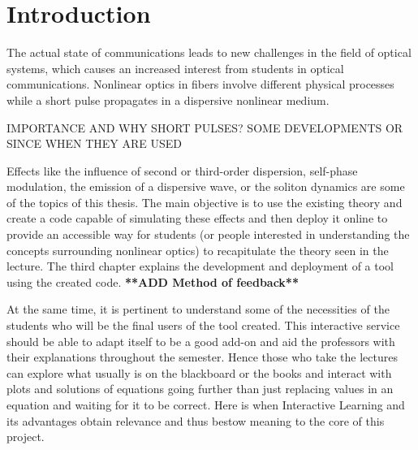 \chapter{Introduction}

The actual state of communications leads to new challenges in the field of optical systems, which causes an increased interest from students in optical communications. Nonlinear optics in fibers involve different physical processes while a short pulse propagates in a dispersive nonlinear medium. 


IMPORTANCE AND WHY SHORT PULSES? SOME DEVELOPMENTS OR SINCE WHEN THEY ARE USED


Effects like the influence of second or third-order dispersion, self-phase modulation, the emission of a dispersive wave, or the soliton dynamics are some of the topics of this thesis. The main objective is to use the existing theory and create a code capable of simulating these effects and then deploy it online to provide an accessible way for students (or people interested in understanding the concepts surrounding nonlinear optics) to recapitulate the theory seen in the lecture. The third chapter explains the development and deployment of a tool using the created code. \textbf{**ADD Method of feedback**} 

At the same time, it is pertinent to understand some of the necessities of the students who will be the final users of the tool created. This interactive service should be able to adapt itself to be a good add-on and aid the professors with their explanations throughout the semester. Hence those who take the lectures can explore what usually is on the blackboard or the books and interact with plots and solutions of equations going further than just replacing values in an equation and waiting for it to be correct. Here is when Interactive Learning and its advantages obtain relevance and thus bestow meaning to the core of this project.



